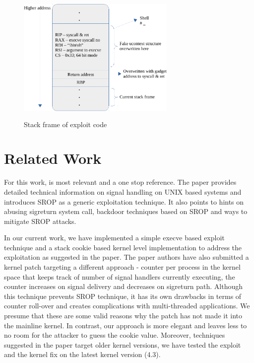 \documentclass{sig-alternate-05-2015}
\begin{document}
\begin{figure}
\centering
\includegraphics[height=2.5in, width=3in]{exploit}
\caption{Stack frame of exploit code}
\label{fig:SFEC}
\end{figure}

\section{Related Work}
For this work, \cite{bosman2014framing} is most relevant and a one 
stop reference. The paper provides detailed technical information 
on signal handling on UNIX based systems and introduces SROP as a 
generic exploitation technique. It also points to hints on abusing 
sigreturn system call, backdoor techniques based on SROP and ways to 
mitigate SROP attacks. 

\par In our current work, we have implemented a simple execve based 
exploit technique and a stack cookie based kernel level implementation
to address the exploitation as suggested in the paper. The paper authors
have also submitted a kernel patch targeting a different approach - counter
per process in the kernel space that keeps track of number of signal handlers
currently executing, the counter increases on signal delivery and decreases
on sigreturn path. Although this technique prevents SROP technique, it has
its own drawbacks in terms of counter roll-over and creates complications with
multi-threaded applications. We presume that these are some valid reasons why
the patch has not made it into the mainline kernel. In contrast, our approach 
is more elegant and leaves less to no room for the attacker to guess the cookie
value. Moreover, techniques suggested in the paper target older kernel versions, 
we have tested the exploit and the kernel fix on the latest kernel version (4.3).
\end{document}
